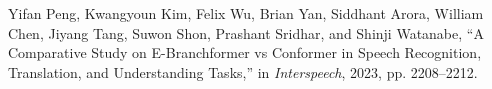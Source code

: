 \documentclass{article}
\begin{document}
\begin{thebibliography}{10}
Yifan Peng, Kwangyoun Kim, Felix Wu, Brian Yan, Siddhant Arora, William Chen,
  Jiyang Tang, Suwon Shon, Prashant Sridhar, and Shinji Watanabe,
\newblock ``{A Comparative Study on E-Branchformer vs Conformer in Speech
  Recognition, Translation, and Understanding Tasks},''
\newblock in {\em Interspeech}, 2023, pp. 2208--2212.

\end{thebibliography}
 

\end{document}
